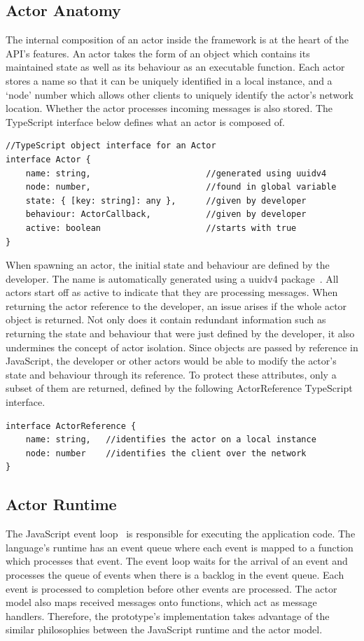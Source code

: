 \documentclass[oneside]{um-fict}
\begin{document}
\subsection{Actor Anatomy}
The internal composition of an actor inside the framework is at the heart of the API's features. An actor takes the form of an object which contains its maintained state as well as its behaviour as an executable function. Each actor stores a name so that it can be uniquely identified in a local instance, and a `node' number which allows other clients to uniquely identify the actor's network location. Whether the actor processes incoming messages is also stored. The TypeScript interface below defines what an actor is composed of.
\begin{lstlisting}
//TypeScript object interface for an Actor
interface Actor {
    name: string,                       //generated using uuidv4
    node: number,                       //found in global variable
    state: { [key: string]: any },      //given by developer
    behaviour: ActorCallback,           //given by developer
    active: boolean                     //starts with true
}
\end{lstlisting}
When spawning an actor, the initial state and behaviour are defined by the developer. The name is automatically generated using a uuidv4 package~\cite{uuidv4}. All actors start off as active to indicate that they are processing messages. When returning the actor reference to the developer, an issue arises if the whole actor object is returned. Not only does it contain redundant information such as returning the state and behaviour that were just defined by the developer, it also undermines the concept of actor isolation. Since objects are passed by reference in JavaScript, the developer or other actors would be able to modify the actor's state and behaviour through its reference. To protect these attributes, only a subset of them are returned, defined by the following ActorReference TypeScript interface.
\begin{lstlisting}
interface ActorReference {
    name: string,   //identifies the actor on a local instance
    node: number    //identifies the client over the network
}
\end{lstlisting}

\subsection{Actor Runtime}
The JavaScript event loop~\cite{eventloopbrowser, eventloopnode} is responsible for executing the application code. The language's runtime has an event queue where each event is mapped to a function which processes that event. The event loop waits for the arrival of an event and processes the queue of events when there is a backlog in the event queue. Each event is processed to completion before other events are processed. The actor model also maps received messages onto functions, which act as message handlers. Therefore, the prototype's implementation takes advantage of the similar philosophies between the JavaScript runtime and the actor model.
\end{document}
